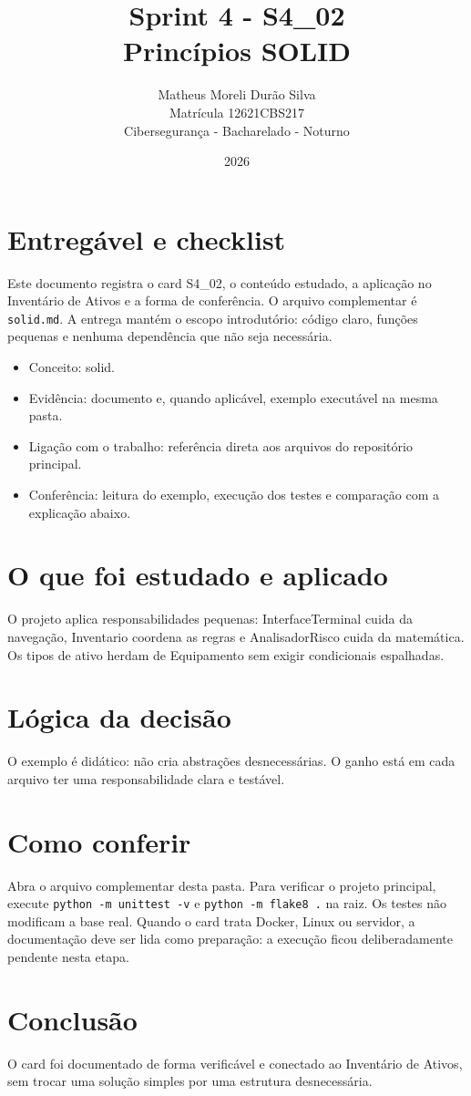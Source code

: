 \documentclass[12pt]{article}
\title{Sprint 4 - S4\_02\\Princípios SOLID}
\author{Matheus Moreli Durão Silva\\ Matrícula 12621CBS217\\ Cibersegurança - Bacharelado - Noturno}
\date{2026}
\begin{document}
\maketitle

\section*{Entregável e checklist}
Este documento registra o card S4\_02, o conteúdo estudado, a aplicação no Inventário de Ativos e a forma de conferência. O arquivo complementar é \texttt{solid.md}. A entrega mantém o escopo introdutório: código claro, funções pequenas e nenhuma dependência que não seja necessária.

\begin{itemize}
\item Conceito: solid.
\item Evidência: documento e, quando aplicável, exemplo executável na mesma pasta.
\item Ligação com o trabalho: referência direta aos arquivos do repositório principal.
\item Conferência: leitura do exemplo, execução dos testes e comparação com a explicação abaixo.
\end{itemize}

\section*{O que foi estudado e aplicado}
O projeto aplica responsabilidades pequenas: InterfaceTerminal cuida da navegação, Inventario coordena as regras e AnalisadorRisco cuida da matemática. Os tipos de ativo herdam de Equipamento sem exigir condicionais espalhadas.

\section*{Lógica da decisão}
O exemplo é didático: não cria abstrações desnecessárias. O ganho está em cada arquivo ter uma responsabilidade clara e testável.

\section*{Como conferir}
Abra o arquivo complementar desta pasta. Para verificar o projeto principal, execute \texttt{python -m unittest -v} e \texttt{python -m flake8 .} na raiz. Os testes não modificam a base real. Quando o card trata Docker, Linux ou servidor, a documentação deve ser lida como preparação: a execução ficou deliberadamente pendente nesta etapa.

\section*{Conclusão}
O card foi documentado de forma verificável e conectado ao Inventário de Ativos, sem trocar uma solução simples por uma estrutura desnecessária.
\end{document}
